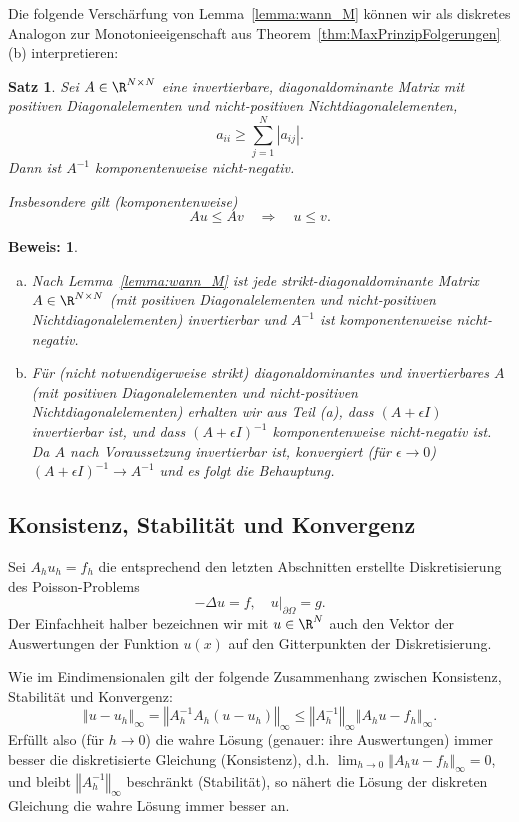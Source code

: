 \documentclass[
]{mycourse}
\theoremstyle{mythm}
\newtheorem{theorem}{Satz}[chapter]
\theoremstyle{break}
\newtheorem*{beweis}{Beweis:}
\newcommand{\norm}[1]{\left\Vert#1\right\Vert}		%
\begin{document}
Die folgende Verschärfung von Lemma~\ref{lemma:wann_M}
können wir als diskretes Analogon zur 
Monotonieeigenschaft aus Theorem~\ref{thm:MaxPrinzipFolgerungen}(b) interpretieren:
\begin{theorem}
Sei $A\in \R^{N\times N}$ eine invertierbare, diagonaldominante Matrix mit positiven Diagonalelementen und nicht-positiven Nichtdiagonalelementen, 
\[
a_{ii}\geq \sum_{j=1}^N |a_{ij}|. 
\]
Dann ist $A^{-1}$ komponentenweise nicht-negativ.

Insbesondere gilt (komponentenweise)
\[
A u\leq A v \quad \Longrightarrow \quad u\leq v.
\]
\end{theorem}
\begin{beweis}
\begin{enumerate}[(a)]
\item Nach Lemma~\ref{lemma:wann_M} ist jede strikt-diagonaldominante Matrix $A\in \R^{N\times N}$
(mit positiven Diagonalelementen und nicht-positiven Nichtdiagonalelementen) invertierbar 
und $A^{-1}$ ist komponentenweise nicht-negativ.
%
\item Für (nicht notwendigerweise strikt) diagonaldominantes und invertierbares $A$ (mit positiven Diagonalelementen und nicht-positiven Nichtdiagonalelementen) erhalten wir aus Teil (a),
dass $(A+\epsilon I)$ invertierbar ist, und dass $(A+\epsilon I)^{-1}$ komponentenweise nicht-negativ ist. Da $A$ nach Voraussetzung invertierbar ist, konvergiert (für $\epsilon\to 0$) $(A+\epsilon I)^{-1}\to A^{-1}$ und es folgt die Behauptung.
\end{enumerate}
\end{beweis}

\subsection{Konsistenz, Stabilität und Konvergenz}

Sei $A_h u_h=f_h$ die entsprechend den letzten Abschnitten erstellte Diskretisierung des Poisson-Problems
\[
-\Delta u=f, \quad u|_{\partial \Omega}=g.
\]
Der Einfachheit halber bezeichnen wir mit $u\in \R^N$ auch den Vektor der Auswertungen der Funktion $u(x)$
auf den Gitterpunkten der Diskretisierung.

Wie im Eindimensionalen gilt der folgende Zusammenhang zwischen Konsistenz, Stabilität und Konvergenz:
\[
\norm{u-u_h}_\infty = \norm{A_h^{-1} A_h (u-u_h)}_\infty\leq \norm{A_h^{-1}}_\infty \norm{A_h u - f_h}_\infty.
\]
Erfüllt also (für $h\to 0$) die wahre Lösung (genauer: ihre Auswertungen) immer besser die diskretisierte Gleichung (Konsistenz),
d.h. $\lim_{h\to 0} \norm{A_h u - f_h}_\infty=0$, und bleibt $\norm{A_h^{-1}}_\infty$ beschränkt (Stabilität), so nähert die
Lösung der diskreten Gleichung die wahre Lösung immer besser an.
\end{document}
